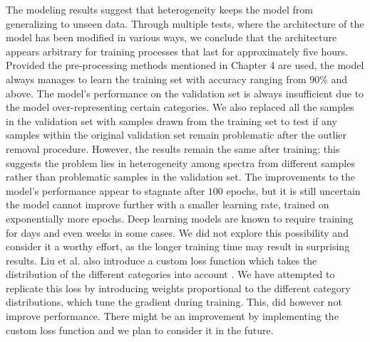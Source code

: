 The modeling results suggest that heterogeneity keeps the model from generalizing to unseen data. Through multiple tests, where the architecture of the model has been modified in various ways, we conclude that the architecture appears arbitrary for training processes that last for approximately five hours. Provided the pre-processing methods mentioned in Chapter 4 are used, the model always manages to learn the training set with accuracy ranging from $90\%$ and above. The model's performance on the validation set is always insufficient due to the model over-representing certain categories. We also replaced all the samples in the validation set with samples drawn from the training set to test if any samples within the original validation set remain problematic after the outlier removal procedure. However, the results remain the same after training; this suggests the problem lies in heterogeneity among spectra from different samples rather than problematic samples in the validation set. The improvements to the model's performance appear to stagnate after $100$ epochs, but it is still uncertain the model cannot improve further with a smaller learning rate, trained on exponentially more epochs. Deep learning models are known to require training for days and even weeks in some cases. We did not explore this possibility and consider it a worthy effort, as the longer training time may result in surprising results. Liu et al. also introduce a custom loss function which takes the distribution of the different categories into account \cite{liu2017deep}. We have attempted to replicate this loss by introducing weights proportional to the different category distributions, which tune the gradient during training. This, did however not improve performance. There might be an improvement by implementing the custom loss function and we plan to consider it in the future.

